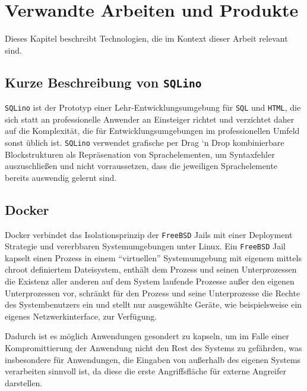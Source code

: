 \section{Verwandte Arbeiten und Produkte}
\label{sec:related-work}

Dieses Kapitel beschreibt Technologien, die im Kontext dieser Arbeit relevant
sind.

\subsection{Kurze Beschreibung von \texttt{SQLino}}

\texttt{SQLino} ist der Prototyp einer Lehr-Entwicklungsumgebung für
\texttt{SQL} und \texttt{HTML}, die sich statt an professionelle Anwender an
Einsteiger richtet und verzichtet daher auf die Komplexität, die für
Entwicklungsumgebungen im professionellen Umfeld sonst üblich ist.
\texttt{SQLino} verwendet grafische per Drag `n Drop kombinierbare
Blockstrukturen als Repräsenation von Sprachelementen, um Syntaxfehler
auszuschließen und nicht vorraussetzen, dass die jeweiligen Sprachelemente
bereits auswendig gelernt sind. \cite{blattwerkzeug-thesis}

\subsection{Docker}
Docker verbindet das Isolationsprinzip der \texttt{FreeBSD} Jails mit einer
Deployment Strategie und vererbbaren Systemumgebungen unter Linux. Ein
\texttt{FreeBSD} Jail kapselt einen Prozess in einem ``virtuellen''
Systemumgebung mit eigenem mittels chroot definiertem Dateisystem, enthält dem
Prozess und seinen Unterprozessen die Existenz aller anderen auf dem System
laufende Prozesse außer den eigenen Unterprozessen vor, schränkt für den Prozess
und seine Unterprozesse die Rechte des Systembenutzers ein und stellt nur
ausgewählte Geräte, wie beispielsweise ein eigenes Netzwerkinterface, zur
Verfügung. \cite{FreeBSD-Jail-doc} \cite{FreeBSD-Jail-developer-comments}
\cite{FreeBSD-Jail-paper}

Dadurch ist es möglich Anwendungen gesondert zu kapseln, um im Falle einer
Kompromittierung der Anwendung nicht den Rest des Systems zu gefährden, was
insbesondere für Anwendungen, die Eingaben von außerhalb des eigenen Systems
verarbeiten sinnvoll ist, da diese die erste Angriffsfläche für externe
Angreifer darstellen.

